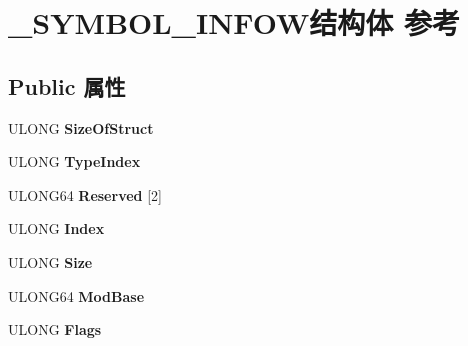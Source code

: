 \hypertarget{struct___s_y_m_b_o_l___i_n_f_o_w}{}\section{\+\_\+\+S\+Y\+M\+B\+O\+L\+\_\+\+I\+N\+F\+O\+W结构体 参考}
\label{struct___s_y_m_b_o_l___i_n_f_o_w}
\subsection*{Public 属性}
\begin{DoxyCompactItemize}
\item 
\mbox{\label{struct___s_y_m_b_o_l___i_n_f_o_w_acc5a90d699e3f93a4d4d8ebc3536552d}} 
U\+L\+O\+NG {\bfseries Size\+Of\+Struct}
\item 
\mbox{\label{struct___s_y_m_b_o_l___i_n_f_o_w_a18b4228d8a4a5f292d4e10e95d4bee57}} 
U\+L\+O\+NG {\bfseries Type\+Index}
\item 
\mbox{\label{struct___s_y_m_b_o_l___i_n_f_o_w_af0a1e3d755f00d4140addb426984d88f}} 
U\+L\+O\+N\+G64 {\bfseries Reserved} \mbox{[}2\mbox{]}
\item 
\mbox{\label{struct___s_y_m_b_o_l___i_n_f_o_w_afac2fb6d69fabb6930cc5abd63eaeba4}} 
U\+L\+O\+NG {\bfseries Index}
\item 
\mbox{\label{struct___s_y_m_b_o_l___i_n_f_o_w_a14efda90da815b15d36e00ce5373125f}} 
U\+L\+O\+NG {\bfseries Size}
\item 
\mbox{\label{struct___s_y_m_b_o_l___i_n_f_o_w_ab9f3cb7109e816ffc9aec678cfe4f94f}} 
U\+L\+O\+N\+G64 {\bfseries Mod\+Base}
\item 
\mbox{\label{struct___s_y_m_b_o_l___i_n_f_o_w_a8120e63c5e915b1b53465a5f1b8cd2a3}} 
U\+L\+O\+NG {\bfseries Flags}
\item 
\mbox{\label{struct___s_y_m_b_o_l___i_n_f_o_w_a9bf5757b5efcfe085876e1bba4ba5519}} 

\end{DoxyCompactItemize}
